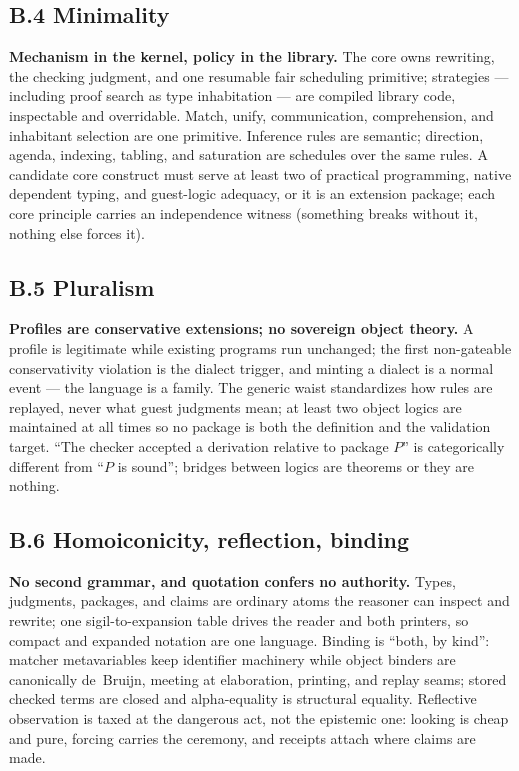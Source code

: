 \documentclass[11pt]{article}
\begin{document}
\subsection*{B.4 Minimality}
\textbf{Mechanism in the kernel, policy in the library.}  The core owns
rewriting, the checking judgment, and one resumable fair scheduling
primitive; strategies --- including proof search as type inhabitation ---
are compiled library code, inspectable and overridable.  Match, unify,
communication, comprehension, and inhabitant selection are one primitive.
Inference rules are semantic; direction, agenda, indexing, tabling, and
saturation are schedules over the same rules.  A candidate core construct
must serve at least two of practical programming, native dependent
typing, and guest-logic adequacy, or it is an extension package; each
core principle carries an independence witness (something breaks without
it, nothing else forces it).

\subsection*{B.5 Pluralism}
\textbf{Profiles are conservative extensions; no sovereign object
theory.}  A profile is legitimate while existing programs run unchanged;
the first non-gateable conservativity violation is the dialect trigger,
and minting a dialect is a normal event --- the language is a family.
The generic waist standardizes how rules are replayed, never what guest
judgments mean; at least two object logics are maintained at all times so
no package is both the definition and the validation target.  ``The
checker accepted a derivation relative to package $P$'' is categorically
different from ``$P$ is sound''; bridges between logics are theorems or
they are nothing.

\subsection*{B.6 Homoiconicity, reflection, binding}
\textbf{No second grammar, and quotation confers no authority.}  Types,
judgments, packages, and claims are ordinary atoms the reasoner can
inspect and rewrite; one sigil-to-expansion table drives the reader and
both printers, so compact and expanded notation are one language.
Binding is ``both, by kind'': matcher metavariables keep identifier
machinery while object binders are canonically de~Bruijn, meeting at
elaboration, printing, and replay seams; stored checked terms are closed
and alpha-equality is structural equality.  Reflective observation is
taxed at the dangerous act, not the epistemic one: looking is cheap and
pure, forcing carries the ceremony, and receipts attach where claims are
made.
\end{document}
